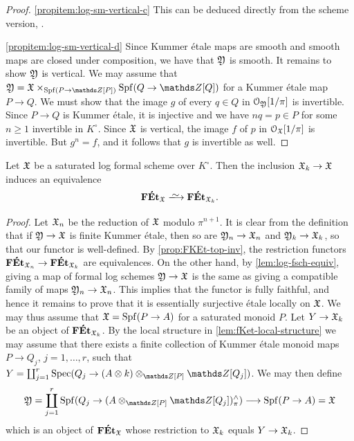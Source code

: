 \begin{proof}
\ref{propitem:log-sm-vertical-c} This can be deduced directly from the scheme version, \cite[Corollary~5.3.7]{AHLS-Log}.

\ref{propitem:log-sm-vertical-d} Since Kummer \'etale maps are smooth and smooth maps are closed under composition, we have that ${\mathfrak{Y}}$ is smooth. It remains to show ${\mathfrak{Y}}$ is vertical. We may assume that $\fY = \fX\times_{\Spf(P\to \bZ[P])}\Spf(Q\to\bZ[Q])$ for a Kummer \'etale map $P\to Q$. We must show that the image $g$ of every $q\in Q$ in ${\mathcal O}_{\mathfrak{Y}}[1/\pi]$ is invertible. Since $P\to Q$ is Kummer \'etale, it is injective and we have $nq=p\in P$ for some $n\geq 1$ invertible in $K^\circ$. Since ${\mathfrak{X}}$ is vertical, the image $f$ of $p$ in ${\mathcal O}_{\mathfrak{X}}[1/\pi]$ is invertible. But $g^n=f$, and it follows that $g$ is invertible as well.
\end{proof}

\begin{prop} \label{prop:FEt-formal-vs-sp-fibre}
    Let ${\mathfrak{X}}$ be a saturated log formal scheme over $K^\circ$. Then the inclusion ${\mathfrak{X}}_k\to {\mathfrak{X}}$ induces an equivalence
    \[
        \FEt_\fX \isomto \FEt_{\fX_k}.
    \]
\end{prop}

\begin{proof}
Let ${\mathfrak{X}}_n$ be the reduction of ${\mathfrak{X}}$ modulo $\pi^{n+1}$. It is clear from the definition that if ${\mathfrak{Y}}\to{\mathfrak{X}}$ is finite Kummer \'etale, then so are ${\mathfrak{Y}}_n\to{\mathfrak{X}}_n$ and ${\mathfrak{Y}}_k\to {\mathfrak{X}}_k$, so that our functor is well-defined. By \cref{prop:FKEt-top-inv}, the restriction functors $\mathbf{F\acute{E}t}_{{\mathfrak{X}}_n}\to\mathbf{F\acute{E}t}_{{\mathfrak{X}}_k}$ are equivalences. On the other hand, by \cref{lem:log-fsch-equiv}, giving a map of formal log schemes ${\mathfrak{Y}}\to{\mathfrak{X}}$ is the same as giving a compatible family of maps ${\mathfrak{Y}}_n\to {\mathfrak{X}}_n$. This implies that the functor is fully faithful, and hence it remains to prove that it is essentially surjective \'etale locally on ${\mathfrak{X}}$. We may thus assume that ${\mathfrak{X}}=\operatorname{Spf}(P\to A)$ for a saturated monoid $P$. Let $Y\to {\mathfrak{X}}_k$ be an object of $\mathbf{F\acute{E}t}_{{\mathfrak{X}}_k}$. By the local structure in \cref{lem:fKet-local-structure} we may assume that there exists a finite collection of Kummer \'etale monoid maps $P\to Q_j$, $j=1,\dots, r$, such that $Y = \coprod_{j=1}^r \Spec(Q_j \to (A\otimes k)\otimes_{\bZ[P]}\bZ[Q_j])$. We may then define 
\[
    \fY = \coprod_{j=1}^r \Spf(Q_j \to (A\otimes_{\bZ[P]}\bZ[Q_j])^\wedge_\pi) \la \Spf(P\to A) = \fX
\]
which is an object of $\mathbf{F\acute{E}t}_{\mathfrak{X}}$ whose restriction to ${\mathfrak{X}}_k$ equals $Y\to{\mathfrak{X}}_k$.
\end{proof}


